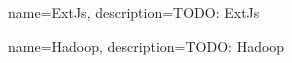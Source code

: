 \usepackage{glossaries}
\makenoidxglossaries

\renewcommand{\glstextformat}[1]{\textit{#1}}

{
    name=ExtJs,
    description={TODO: ExtJs}
}

{
    name=Hadoop,
    description={TODO: Hadoop}
}


